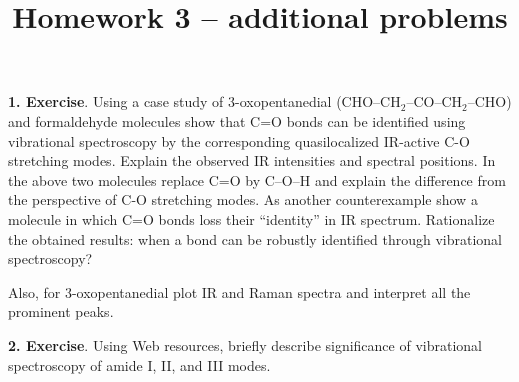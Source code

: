 \documentclass{homework}
\begin{document}
\title{Homework 3  -- additional problems}
\maketitle

\textbf{1. Exercise}. Using a case study of 3-oxopentanedial (CHO--CH$_2$--CO--CH$_2$--CHO) and formaldehyde molecules show that C=O bonds can be identified using vibrational spectroscopy by the corresponding quasilocalized IR-active C-O stretching modes. Explain the observed IR intensities and spectral positions. In the above two molecules replace C=O by C--O--H and explain the difference from the perspective of C-O stretching modes. As another counterexample show a molecule in which C=O bonds loss their ``identity'' in IR spectrum. Rationalize the obtained results: when a bond can be robustly identified through vibrational spectroscopy?

Also, for 3-oxopentanedial plot IR and Raman spectra and interpret all the prominent peaks.

\bigskip

\textbf{2. Exercise}. Using Web resources, briefly describe significance of vibrational spectroscopy of amide I, II, and III modes.
\end{document}
